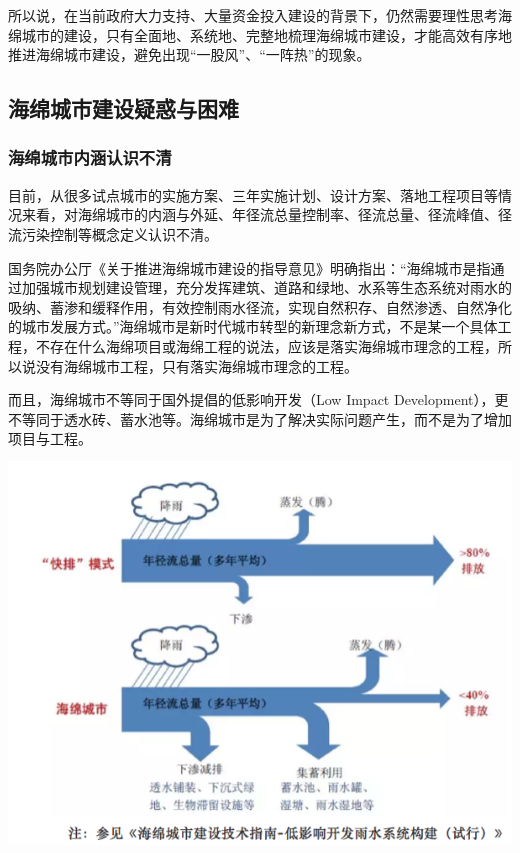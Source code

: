 \documentclass[
]{book}
\begin{document}
所以说，在当前政府大力支持、大量资金投入建设的背景下，仍然需要理性思考海绵城市的建设，只有全面地、系统地、完整地梳理海绵城市建设，才能高效有序地推进海绵城市建设，避免出现``一股风''、``一阵热''的现象。

\hypertarget{ux6d77ux7ef5ux57ceux5e02ux5efaux8bbeux7591ux60d1ux4e0eux56f0ux96be}{%
\subsection{海绵城市建设疑惑与困难}\label{ux6d77ux7ef5ux57ceux5e02ux5efaux8bbeux7591ux60d1ux4e0eux56f0ux96be}}

\hypertarget{ux6d77ux7ef5ux57ceux5e02ux5185ux6db5ux8ba4ux8bc6ux4e0dux6e05}{%
\subsubsection{海绵城市内涵认识不清}\label{ux6d77ux7ef5ux57ceux5e02ux5185ux6db5ux8ba4ux8bc6ux4e0dux6e05}}

目前，从很多试点城市的实施方案、三年实施计划、设计方案、落地工程项目等情况来看，对海绵城市的内涵与外延、年径流总量控制率、径流总量、径流峰值、径流污染控制等概念定义认识不清。

国务院办公厅《关于推进海绵城市建设的指导意见》明确指出：``海绵城市是指通过加强城市规划建设管理，充分发挥建筑、道路和绿地、水系等生态系统对雨水的吸纳、蓄渗和缓释作用，有效控制雨水径流，实现自然积存、自然渗透、自然净化的城市发展方式。''海绵城市是新时代城市转型的新理念新方式，不是某一个具体工程，不存在什么海绵项目或海绵工程的说法，应该是落实海绵城市理念的工程，所以说没有海绵城市工程，只有落实海绵城市理念的工程。

而且，海绵城市不等同于国外提倡的低影响开发（Low Impact Development），更不等同于透水砖、蓄水池等。海绵城市是为了解决实际问题产生，而不是为了增加项目与工程。

\includegraphics[width=8.33in]{images/hm2}
\end{document}
